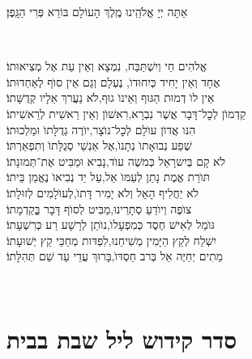 אַתָּה יְיָ אֱלֹהֵֽינוּ מֶֽלֶךְ הָעוֹלָם בּוֹרֵא פְּרִי הַגָּֽפֶן׃




\aleinu

\\
\mournerskaddish
\nextpage

אֱלהִים חַי וְיִשְׁתַּבַּח, \hfill נִמְצָא וְאֵין עֵת אֶל מְצִיאוּתוֹ׃ \\
אֶחָד וְאֵין יָחִיד כְּיִחוּדוׂ, \hfill נֶעְלָם וְגַם אֵין סוׂף לְאַחְדוּתוֹ׃ \\
אֵין לוׂ דְמוּת הַגּוּף וְאֵינוׂ גוּף,\hfill לׂא נַעֲרךְ אֵלָיו קְדֻשָּׁתוֹ׃ \\
קַדְמוׂן לְכׇל־דָּבָר אֲשֶׁר נִבְרָא,\hfill רִאשׁוׂן וְאֵין רֵאשִׁית לְרֵאשִׁיתוֹ׃ \\
הִנּו אֲדוׂן עוׂלָם לְכׇל־נוׂצָר,\hfill יוׂרֶה גְדֻלָּתוׂ וּמַלְכוּתוֹ׃ \\
שֶׁפַע נְבוּאָתוׂ נְתָנוׂ,\hfill אֶל אַנְשֵׁי סְגֻלָּתוׂ וְתִפְאַרְתּוֹ׃ \\
לׂא קָם בְּיִשרָאֵל כְּמשֶׁה עוׂד,\hfill נָבִיא וּמַבִּיט אֶת־תְּמוּנָתוֹ׃ \\
תּוׂרַת אֱמֶת נָתַן לְעַמּוׂ אֵל,\hfill עַל יַד נְבִיאוׂ נֶאֱמַן בֵּיתוֹ׃ \\
לׂא יַחֲלִיף הָאֵל וְלׂא יָמִיר דָּתוׂ,\hfill לְעוׂלָמִים לְזוּלָתוֹ׃ \\
צוׂפֶה וְיוׂדֵעַ סְתָרֵינוּ,\hfill מַבִּיט לְסוׂף דָּבָר בְְַּקַדְמָתוֹ׃ \\
גּוׂמֵל לְאִישׁ חֶסֶד כְּמִפְעָלוׂ,\hfill נוׂתֵן לְרָשָׁע רַע כְּרִשְׁעָתוֹ׃ \\
יִשְׁלַח לְקֵץ הַיָּמִין מְשִׁיחֵנוּ,\hfill לִפְדּות מְחַכֵּי קֵץ יְשׁוּעָתוֹ׃ \\
מֵתִים יְחַיֶּה אֵל בְּרב חַסְדּוׂ,\hfill בָּרוּךְ עֲדֵי עַד שֵׁם תְּהִלָּתוֹ׃\\

\vfill

\quad{}\quad{}\\

\chapter[קידוש ליל שבת]{ סדר קידוש ליל שבת בבית }



